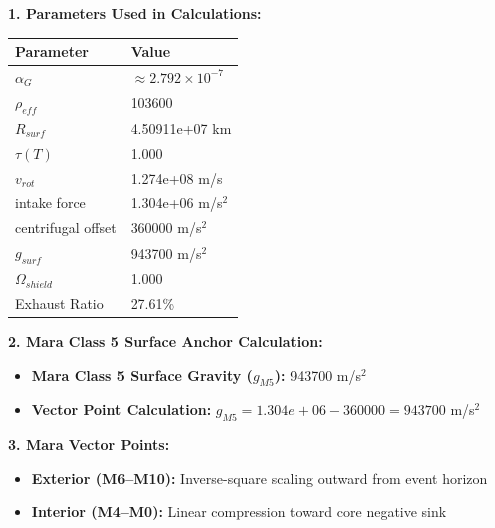 \documentclass[11pt, a4paper]{article}
\begin{document}
\vspace{0.5em}
\noindent \textbf{1. Parameters Used in Calculations:}
\begin{center}
  \begin{tabular}{|l|l|}
    \hline
    \textbf{Parameter} & \textbf{Value} \\ \hline
    $\alpha_G$ & $\approx 2.792 \times 10^{-7}$ \\ \hline
    $\rho_{eff}$ & 103600 \\ \hline
    $R_{surf}$ & 4.50911e+07 km \\ \hline
    $\tau(T)$ & 1.000 \\ \hline
    $v_{rot}$ & 1.274e+08 m/s \\ \hline
    intake force & 1.304e+06 m/s$^2$ \\ \hline
    centrifugal offset & 360000 m/s$^2$ \\ \hline
    $g_{surf}$ & 943700 m/s$^2$ \\ \hline
    $\Omega_{shield}$ & 1.000 \\ \hline
    Exhaust Ratio & 27.61\% \\ \hline
  \end{tabular}
\end{center}

\vspace{0.5em}
\noindent \textbf{2. Mara Class 5 Surface Anchor Calculation:}
\begin{itemize}
  \item \textbf{Mara Class 5 Surface Gravity ($g_{M5}$):} 943700 m/s$^2$
  \item \textbf{Vector Point Calculation:} $g_{M5} = 1.304e+06 - 360000 = 943700$ m/s$^2$
\end{itemize}

\vspace{0.5em}
\noindent \textbf{3. Mara Vector Points:}
\begin{itemize}
  \item \textbf{Exterior (M6--M10):} Inverse-square scaling outward from event horizon
  \item \textbf{Interior (M4--M0):} Linear compression toward core negative sink
\end{itemize}
\end{document}
